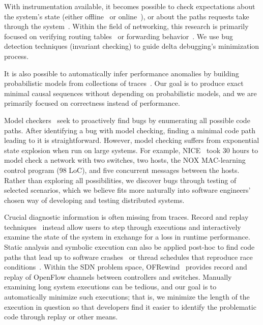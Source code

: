 \vspace{0.05in}
 With instrumentation available, it becomes possible
to check expectations about the
system's state (either offline~\cite{Liu07widschecker} or online~\cite{d3s,dao2009live}), or about the paths requests take through
the system~\cite{pip}. Within the field of networking, this research is
primarily focused on verifying routing tables~\cite{hsa,hsa_realtime,anteater,khurshid2012veriflow}
or forwarding behavior~\cite{Zeng:2012:ATP:2413176.2413205,libra}.
We use bug detection techniques (invariant checking) to guide delta debugging's minimization
process.

It is also possible to automatically infer
performance anomalies by building probabilistic models from
collections of traces~\cite{barham2004using,Chen02pinpoint:problem}.
Our goal is to produce exact minimal causal sequences without
depending on probabilistic models, and we are primarily focused on correctness
instead of performance.

Model checkers~\cite{killian2007life,nice} seek to
proactively find bugs by enumerating all possible code paths.
After identifying a bug with model checking, finding a minimal code path leading to it is
straightforward. However, model checking suffers from exponential
state explosion when run on large systems. For example, NICE~\cite{nice} took 30 hours to
model check a network with two switches, two hosts, the NOX MAC-learning
control program (98 LoC), and five concurrent
messages between the hosts. Rather than exploring all
possibilities, we discover bugs through testing of selected scenarios,
which we believe fits more naturally into software engineers' chosen
way of developing and testing distributed systems.

\vspace{0.05in}
 Crucial diagnostic information is often missing from traces.
Record and replay techniques~\cite{Geels:2006:RDD:1267359.1267386,lin2013defined}
instead allow users to step through executions and interactively examine the
state of the system in exchange for a loss in runtime performance.
Static analysis and symbolic execution can also be applied post-hoc %
to find code paths that lead up to software
crashes~\cite{Yuan:2010:SED:1736020.1736038} or thread schedules that reproduce
race conditions~\cite{Zamfir:2010:EST:1755913.1755946}.
Within the SDN problem space, OFRewind~\cite{ofrewind} provides
record and replay of OpenFlow channels between controllers and switches.
Manually examining long system executions can be tedious, and our goal is to
automatically minimize such executions; that is, we minimize the length of
the execution in question so that developers find it easier to identify the
problematic code through replay or other means.

